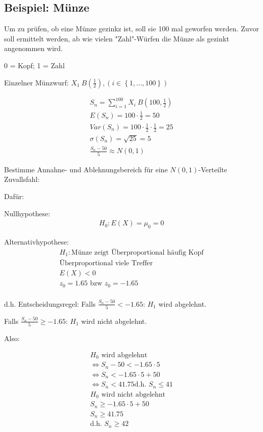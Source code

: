 \subsection{Beispiel: Münze}

Um zu prüfen, ob eine Münze gezinkz ist, soll sie 100 mal geworfen werden.
Zuvor soll ermittelt werden, ab wie vielen "Zahl"-Würfen die Münze als gezinkt
angenommen wird.

0 = Kopf; 1 = Zahl

Einzelner Münzwurf: $X_1 ~ B\left(\frac{1}{2}\right), (i \in \left\{1, \dots,
    100\right\})$

\begin{align*}
    S_n = \sum_{i=1}^{100} X_i ~ B\left(100, \frac{1}{2}\right) \\
    E(S_n) = 100 \cdot \frac{1}{2} = 50                         \\
    Var(S_n) = 100 \cdot \frac{1}{2} \cdot \frac{1}{2} = 25     \\
    \sigma (S_n) = \sqrt{25} = 5                                \\
    \frac{S_n - 50}{5} \approx N(0,1)
\end{align*}

Bestimme Annahne- und Ablehnungsbereich für eine $N(0,1)$-Verteilte
Zuvallsfahl:

Dafür:

Nullhypothese:
\begin{align*}
    H_0: E(X) = \mu_0 = 0
\end{align*}

Alternativhypothese:
\begin{align*}
    H_1: \text{Münze zeigt Überproportional häufig Kopf} \\
    \text{Überproportional viele Treffer}                \\
    E(X) < 0                                             \\
    z_0 = 1.65 \text{ bzw } z_0 = -1.65                  \\
\end{align*}

d.h. Entscheidungsregel: Falls $\frac{S_n - 50}{5} < -1.65$: $H_1$ wird
abgelehnt.

Falls $\frac{S_n - 50}{5} \geq -1.65$: $H_1$ wird nicht abgelehnt.

Also:

\begin{align*}
    H_0 \text{ wird abgelehnt}               \\
    \Leftrightarrow S_n - 50 < -1.65 \cdot 5 \\
    \Leftrightarrow S_n < -1.65 \cdot 5 + 50 \\
    \Leftrightarrow S_n < 41.75
    \text{d.h. } S_n \leq 41                 \\
    H_0 \text{ wird nicht abgelehnt}         \\
    S_n \geq -1.65 \cdot 5 + 50              \\
    S_n \geq 41.75                           \\
    \text{d.h. } S_n \geq 42
\end{align*}

